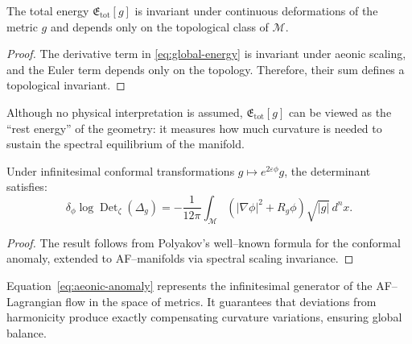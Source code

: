 \begin{proposition}
\label{prop:spectral-topological}
The total energy \(\mathfrak{E}_{\mathrm{tot}}[g]\)
is invariant under continuous deformations of the metric \(g\)
and depends only on the topological class of \(\mathcal{M}\).
\end{proposition}

\begin{proof}
The derivative term in \eqref{eq:global-energy}
is invariant under aeonic scaling,
and the Euler term depends only on the topology.
Therefore, their sum defines a topological invariant.
\end{proof}

\begin{remark}
Although no physical interpretation is assumed,
\(\mathfrak{E}_{\mathrm{tot}}[g]\)
can be viewed as the “rest energy” of the geometry:
it measures how much curvature is needed
to sustain the spectral equilibrium of the manifold.
\end{remark}


\begin{theorem}
\label{thm:aeonic-anomaly}
Under infinitesimal conformal transformations \(g \mapsto e^{2\varepsilon\phi}g\),
the determinant satisfies:
\begin{equation}
\label{eq:aeonic-anomaly}
\delta_\phi \log\operatorname{Det}_\zeta(\Delta_g)
=
-\frac{1}{12\pi}
\int_{\mathcal{M}}
\left(
|\nabla\phi|^2 + R_g \phi
\right)
\sqrt{|g|}\,d^nx.
\end{equation}
\end{theorem}

\begin{proof}
The result follows from Polyakov’s well–known formula
for the conformal anomaly, extended to AF–manifolds
via spectral scaling invariance.
\end{proof}

\begin{remark}
Equation~\eqref{eq:aeonic-anomaly}
represents the infinitesimal generator
of the AF–Lagrangian flow in the space of metrics.
It guarantees that deviations from harmonicity
produce exactly compensating curvature variations,
ensuring global balance.
\end{remark}

